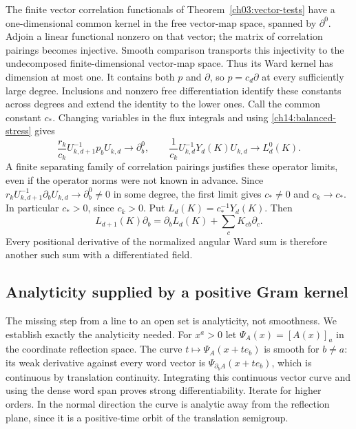 The finite vector correlation functionals of Theorem~\ref{ch03:vector-tests} have a
one-dimensional common kernel in the free vector-map space, spanned
by $\partial^0$. Adjoin a linear functional nonzero on that vector;
the matrix of correlation pairings becomes injective. Smooth comparison transports
this injectivity to the undecomposed finite-dimensional vector-map space.
Thus its Ward kernel has dimension at most one. It contains both
$p$ and $\partial$, so $p=c_d\partial$ at every sufficiently large
degree. Inclusions and nonzero free differentiation identify these
constants across degrees and extend the identity to the lower ones.
Call the common constant $c_*$. Changing variables in the flux
integrals and using \eqref{ch14:balanced-stress} gives
\begin{equation}\label{ch14:charge-limits}
 \frac{r_k}{c_k}U_{k,d+1}^{-1}p_bU_{k,d}\to\partial_b^0,
 \qquad
 \frac1{c_k}U_{k,d}^{-1}Y_d(K)U_{k,d}\to L_d^0(K).
\end{equation}
A finite separating family of correlation pairings justifies these operator limits, even if the
operator norms were not known in advance. Since
$r_kU_{k,d+1}^{-1}\partial_bU_{k,d}\to\partial_b^0\ne0$
in some degree, the first limit gives $c_*\ne0$ and $c_k\to c_*$.
In particular $c_*>0$, since $c_k>0$.
Put $L_d(K)=c_*^{-1}Y_d(K)$. Then
\begin{equation}\label{ch14:derivative-commutator}
 L_{d+1}(K)\partial_b=\partial_bL_d(K)+\sum_cK_{cb}\partial_c.
\end{equation}
Every positional derivative of the normalized angular Ward sum is
therefore another such sum with a differentiated field.

\subsection{Analyticity supplied by a positive Gram kernel}

The missing step from a line to an open set is analyticity, not
smoothness. We establish exactly the analyticity needed.
For $x^a>0$ let $\Psi_A(x)=[A(x)]_a$ in the coordinate reflection
space. The curve $t\mapsto\Psi_A(x+te_b)$ is smooth for $b\ne a$:
its weak derivative against every word vector is
$\Psi_{\partial_b A}(x+te_b)$, which is continuous by translation
continuity. Integrating this continuous vector curve and using the
dense word span proves strong differentiability. Iterate for higher
orders. In the normal direction the curve is analytic away from the
reflection plane, since it is a positive-time orbit of the translation semigroup.

